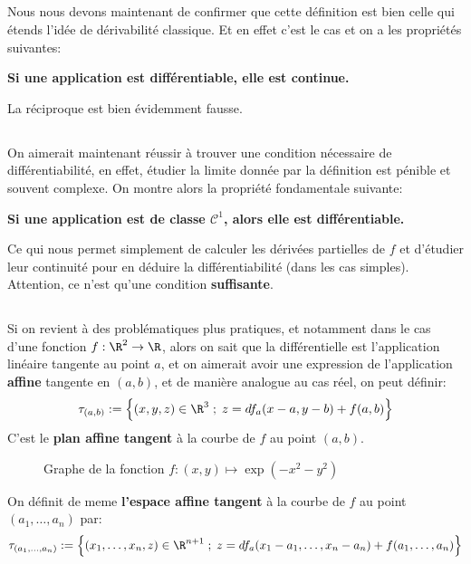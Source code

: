 \subsection*{}
Nous nous devons maintenant de confirmer que cette définition est bien celle qui étends l'idée de dérivabilité classique. Et en effet c'est le cas et on a les propriétés suivantes:
\begin{center}
   \textbf{Si une application est différentiable, elle est continue.}
\end{center}
La réciproque est bien évidemment fausse.
\subsection*{}
On aimerait maintenant réussir à trouver une condition nécessaire de différentiabilité, en effet, étudier la limite donnée par la définition est pénible et souvent complexe.\+
On montre alors la propriété fondamentale suivante:
\begin{center}
   \textbf{Si une application est de classe \(\mathcal{C}^1\), alors elle est différentiable.}
\end{center}
Ce qui nous permet simplement de calculer les dérivées partielles de \(f\) et d'étudier leur continuité pour en déduire la différentiabilité (dans les cas simples). Attention, ce n'est qu'une condition \textbf{suffisante}.
\subsection*{}
Si on revient à des problématiques plus pratiques, et notamment dans le cas d'une fonction \(f : \R^2 \rightarrow \R\), alors on sait que la différentielle est l'application linéaire tangente au point \(a\), et on aimerait avoir une expression de l'application \textbf{affine} tangente en \((a, b)\), et de manière analogue au cas réel, on peut définir:
\[
   \tau_{(a, b)} := \Bigl\{ (x, y, z) \in \R^3 \; ; \; z = df_a(x - a, y - b) + f(a, b) \Bigl\}    
\]
C'est le \textbf{plan affine tangent} à la courbe de \(f\) au point \((a, b)\).

\begin{figure}[h]
   \centering
   \captionsetup{labelformat=empty}
   \caption{Graphe de la fonction \(f : (x, y) \mapsto \exp(-x^2 - y^2)\)}
\end{figure}
On définit de meme \textbf{l'espace affine tangent} à la courbe de \(f\) au point \((a_1, \ldots, a_n)\) par:
\[
   \tau_{(a_1, \ldots, a_n)} := \Bigl\{ (x_1, \ldots, x_n, z) \in \R^{n+1} \; ; \; z = df_a(x_1 - a_1, \ldots, x_n - a_n) + f(a_1, \ldots, a_n) \Bigl\}    
\]

